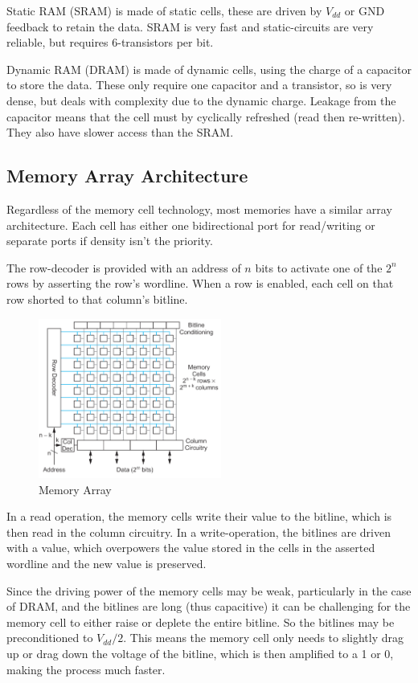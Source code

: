\documentclass{article}
\begin{document}
Static RAM (SRAM) is made of static cells, these are driven by $V_{dd}$ or GND feedback to retain the data. SRAM is very fast and static-circuits are very reliable, but requires 6-transistors per bit. 

Dynamic RAM (DRAM) is made of dynamic cells, using the charge of a capacitor to store the data. These only require one capacitor and a transistor, so is very dense, but deals with complexity due to the dynamic charge. Leakage from the capacitor means that the cell must by cyclically refreshed (read then re-written). They also have slower access than the SRAM. 




\subsection{Memory Array Architecture}

Regardless of the memory cell technology, most memories have a similar array architecture. Each cell  has either one bidirectional port for read/writing or separate ports if density isn't the priority. 

The row-decoder is provided with an address of $n$ bits to activate one of the $2^n$ rows by asserting the row's wordline. When a row is enabled, each cell on that row shorted to that column's bitline. 

\begin{figure}[ht!]
\centering
\includegraphics[width=60mm]{Array.png}
\caption{Memory Array}
\end{figure}

In a read operation, the memory cells write their value to the bitline, which is then read in the column circuitry. In a write-operation, the bitlines are driven with a value, which overpowers the value stored in the cells in the asserted wordline and the new value is preserved. 

Since the driving power of the memory cells may be weak, particularly in the case of DRAM, and the bitlines are long (thus capacitive) it can be challenging for the memory cell to either raise or deplete the entire bitline. So the bitlines may be preconditioned to $V_{dd}/2$. This means the memory cell only needs to slightly drag up or drag down the voltage of the bitline, which is then amplified to a 1 or 0, making the process much faster. 
\end{document}
